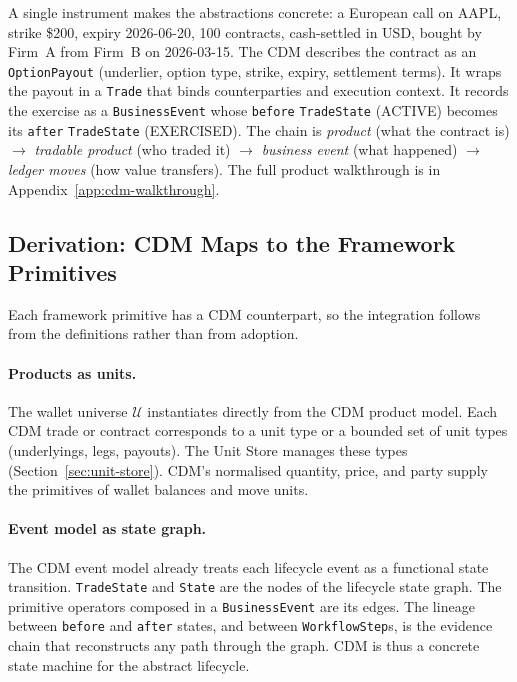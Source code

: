 A single instrument makes the abstractions concrete: a European call on AAPL, strike \$200, expiry 2026-06-20, 100 contracts, cash-settled in USD, bought by Firm~A from Firm~B on 2026-03-15. The CDM describes the contract as an \texttt{OptionPayout} (underlier, option type, strike, expiry, settlement terms). It wraps the payout in a \texttt{Trade} that binds counterparties and execution context. It records the exercise as a \texttt{BusinessEvent} whose \texttt{before} \texttt{TradeState} (ACTIVE) becomes its \texttt{after} \texttt{TradeState} (EXERCISED). The chain is \emph{product} (what the contract is) $\to$ \emph{tradable product} (who traded it) $\to$ \emph{business event} (what happened) $\to$ \emph{ledger moves} (how value transfers). The full product walkthrough is in Appendix~\ref{app:cdm-walkthrough}.

\subsection{Derivation: CDM Maps to the Framework Primitives}

Each framework primitive has a CDM counterpart, so the integration follows from the definitions rather than from adoption.

\paragraph{Products as units.} The wallet universe $\mathcal{U}$ instantiates directly from the CDM product model. Each CDM trade or contract corresponds to a unit type or a bounded set of unit types (underlyings, legs, payouts). The Unit Store manages these types (Section~\ref{sec:unit-store}). CDM's normalised quantity, price, and party supply the primitives of wallet balances and move units.

\paragraph{Event model as state graph.} The CDM event model already treats each lifecycle event as a functional state transition. \texttt{TradeState} and \texttt{State} are the nodes of the lifecycle state graph. The primitive operators composed in a \texttt{BusinessEvent} are its edges. The lineage between \texttt{before} and \texttt{after} states, and between \texttt{WorkflowStep}s, is the evidence chain that reconstructs any path through the graph. CDM is thus a concrete state machine for the abstract lifecycle.

